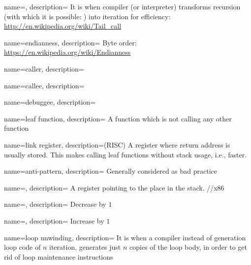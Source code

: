 {
  name=,
  description={
  {It is when compiler (or interpreter) transforms recursion (with which it is possible: ) 
  into iteration for efficiency}: \url{http://en.wikipedia.org/wiki/Tail_call}}
}

{
  name=endianness,
  description={
  {Byte order}: \url{https://en.wikipedia.org/wiki/Endianness}}
}

{
  name=caller,
  description={}
}

{
  name=callee,
  description={}
}

{
  name=debuggee,
  description={}
}

{
  name=leaf function,
  description={
  {A function which is not calling any other function}}
}

{
  name=link register,
  description=(RISC) {
  {A register where return address is usually stored.
  This makes calling leaf functions without stack usage, i.e., faster.}}
}

{
  name=anti-pattern,
  description={
  {Generally considered as bad practice}}
}

{
  name=,
  description={
  {A register pointing to the place in the stack.}
  \SP/\ESP/\RSP \InENRU x86}
}

{
  name=,
  description={
  {Decrease by $1$}}
}

{
  name=,
  description={
  {Increase by $1$}}
}

{
  name=loop unwinding,
  description={
  {It is when a compiler instead of generation loop code of $n$ iteration, generates just $n$ copies of the
  loop body, in order to get rid of loop maintenance instructions}}
}

